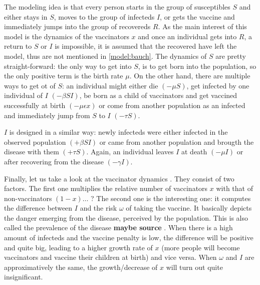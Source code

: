 \documentclass[12pt,a4paper,twoside]{article}
\begin{document}
The modeling idea is that every person starts in the group of susceptibles $S$ and either stays in $S$, moves to the group of infecteds $I$, or gets the vaccine and immediately jumps into the group of recovereds $R$. As the main interest of this model is the dynamics of the vaccinators $x$ and once an individual gets into $R$, a return to $S$ or $I$ is impossible, it is assumed that the recovered have left the model, thus are not mentioned in \eqref{model:bauch}. The dynamics of $S$ are pretty straight-forward: the only way to get into $S$, is to get born into the population, so the only positive term is the birth rate $\mu$. On the other hand, there are multiple ways to get ot of $S$: an individual might either die $\left(-\mu S\right)$, get infected by one individual of $I$ $\left(-\beta SI\right)$, be born as a child of vaccinators and get vaccined successfully at birth $\left(-\mu\epsilon x\right)$ or come from another population as an infected and immediately jump from $S$ to $I$ $\left(-\tau S\right)$. 

$I$ is designed in a similar way: newly infecteds were either infected in the observed population $\left(+\beta SI\right)$ or came from another population and brougth the disease with them $\left(+\tau S\right)$. Again, an individual leaves $I$ at death $\left(-\mu I\right)$ or after recovering from the disease $\left(-\gamma I\right)$. 

Finally, let us take a look at the vaccinator dynamics%
. They consist of two factors. The first one multiplies the relative number of vaccinators $x$ with that of non-vaccinators $\left(1-x\right)\dots$%
? The second one is the interesting one: it computes the difference between $I$ and the risk $\omega$ of taking the vaccine. It basically depicts the danger emerging from the disease, perceived by the population. This is also called the prevalence of the disease \textbf{maybe source}%
. When there is a high amount of infecteds and the vaccine penalty is low, the difference will be positive and quite big, leading to a higher growth rate of $x$ (more people will become vaccinators and vaccine their children at birth) and vice versa. When $\omega$ and $I$ are approximatively the same, the growth/decrease of $x$ will turn out quite insignificant.
\end{document}
